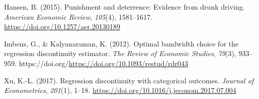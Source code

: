 \documentclass[
  11pt,
]{article}
\newlength{\cslhangindent}
\newlength{\cslentryspacingunit} %
\newenvironment{CSLReferences}[2] %
 {%
  \setlength{\parindent}{0pt}
  \ifodd #1
  \let\oldpar\par
  \def\par{\hangindent=\cslhangindent\oldpar}
  \fi
  \setlength{\parskip}{#2\cslentryspacingunit}
 }%
 {}
\begin{document}
\begin{CSLReferences}{1}{0}
\leavevmode{}%
Hansen, B. (2015). Punishment and deterrence: Evidence from drunk
driving. \emph{American Economic Review}, \emph{105}(4), 1581--1617.
\url{https://doi.org/10.1257/aer.20130189}

\leavevmode{}%
Imbens, G., \& Kalyanaraman, K. (2012). Optimal bandwidth choice for the
regression discontinuity estimator. \emph{The Review of Economic
Studies}, \emph{79}(3), 933--959.
https://doi.org/\url{https://doi.org/10.1093/restud/rdr043}

\leavevmode{}%
Xu, K.-L. (2017). Regression discontinuity with categorical outcomes.
\emph{Journal of Econometrics}, \emph{201}(1), 1--18.
\url{https://doi.org/10.1016/j.jeconom.2017.07.004}

\end{CSLReferences}
\end{document}
